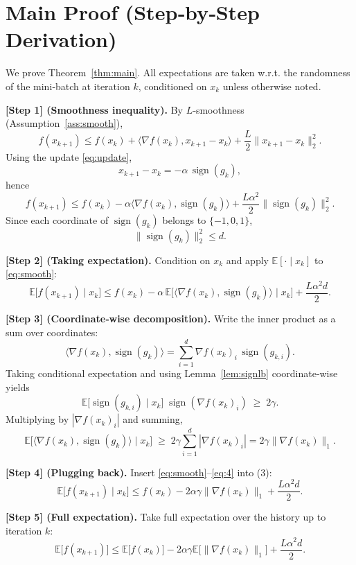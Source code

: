\documentclass[11pt]{article}
\newcommand{\sign}{\operatorname{sign}}
\newcommand{\EE}{\mathbb{E}}
\begin{document}
\section*{Main Proof (Step‑by‑Step Derivation)}
We prove Theorem~\ref{thm:main}. All expectations are taken w.r.t. the randomness of the mini‑batch at iteration $k$, conditioned on $x_{k}$ unless otherwise noted.

\bigskip
\noindent\textbf{[Step 1] (Smoothness inequality).}  
By $L$‑smoothness (Assumption~\ref{ass:smooth}),
\[
f(x_{k+1})\le f(x_{k})+\langle\nabla f(x_{k}),x_{k+1}-x_{k}\rangle
+\frac{L}{2}\|x_{k+1}-x_{k}\|_{2}^{2}.
\]
Using the update \eqref{eq:update},
\[
x_{k+1}-x_{k}= -\alpha\,\sign(g_{k}),
\]
hence
\begin{equation}
\label{eq:smooth}
f(x_{k+1})\le f(x_{k})-\alpha\langle\nabla f(x_{k}),\sign(g_{k})\rangle
+\frac{L\alpha^{2}}{2}\|\sign(g_{k})\|_{2}^{2}.
\end{equation}
Since each coordinate of $\sign(g_{k})$ belongs to $\{-1,0,1\}$,
\[
\|\sign(g_{k})\|_{2}^{2}\le d .
\tag{2}
\]

\bigskip
\noindent\textbf{[Step 2] (Taking expectation).}  
Condition on $x_{k}$ and apply $\EE[\cdot\mid x_{k}]$ to \eqref{eq:smooth}:
\[
\EE\!\big[f(x_{k+1})\mid x_{k}\big]\le f(x_{k})-\alpha\,
\EE\!\big[\langle\nabla f(x_{k}),\sign(g_{k})\rangle\mid x_{k}\big]
+\frac{L\alpha^{2}d}{2}.
\tag{3}
\]

\bigskip
\noindent\textbf{[Step 3] (Coordinate‑wise decomposition).}  
Write the inner product as a sum over coordinates:
\[
\langle\nabla f(x_{k}),\sign(g_{k})\rangle
=\sum_{i=1}^{d}\nabla f(x_{k})_{i}\,\sign(g_{k,i}).
\]
Taking conditional expectation and using Lemma~\ref{lem:signlb} coordinate‑wise yields
\[
\EE\!\big[\sign(g_{k,i})\mid x_{k}\big]\;\sign(\nabla f(x_{k})_{i})\;\ge\;2\gamma .
\]
Multiplying by $|\nabla f(x_{k})_{i}|$ and summing,
\[
\EE\!\big[\langle\nabla f(x_{k}),\sign(g_{k})\rangle\mid x_{k}\big]
\;\ge\;2\gamma\sum_{i=1}^{d}|\nabla f(x_{k})_{i}|
=2\gamma\|\nabla f(x_{k})\|_{1}.
\tag{4}
\]

\bigskip
\noindent\textbf{[Step 4] (Plugging back).}  
Insert \eqref{eq:smooth}–\eqref{eq:4} into (3):
\[
\EE\!\big[f(x_{k+1})\mid x_{k}\big]
\le f(x_{k})-2\alpha\gamma\|\nabla f(x_{k})\|_{1}
+\frac{L\alpha^{2}d}{2}.
\tag{5}
\]

\bigskip
\noindent\textbf{[Step 5] (Full expectation).}  
Take full expectation over the history up to iteration $k$:
\[
\EE\!\big[f(x_{k+1})\big]\le \EE\!\big[f(x_{k})\big]
-2\alpha\gamma\EE\!\big[\|\nabla f(x_{k})\|_{1}\big]
+\frac{L\alpha^{2}d}{2}.
\tag{6}
\]
\end{document}

